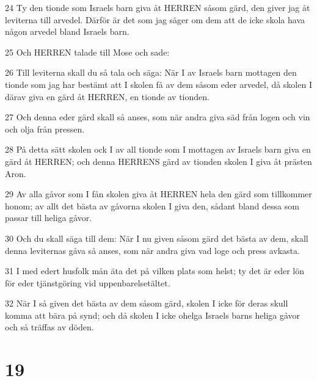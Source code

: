 \par 24 Ty den tionde som Israels barn giva åt HERREN såsom gärd, den giver jag åt leviterna till arvedel. Därför är det som jag säger om dem att de icke skola hava någon arvedel bland Israels barn.
\par 25 Och HERREN talade till Mose och sade:
\par 26 Till leviterna skall du så tala och säga: När I av Israels barn mottagen den tionde som jag har bestämt att I skolen få av dem såsom eder arvedel, då skolen I därav giva en gärd åt HERREN, en tionde av tionden.
\par 27 Och denna eder gärd skall så anses, som när andra giva säd från logen och vin och olja från pressen.
\par 28 På detta sätt skolen ock I av all tionde som I mottagen av Israels barn giva en gärd åt HERREN; och denna HERRENS gärd av tionden skolen I giva åt prästen Aron.
\par 29 Av alla gåvor som I fån skolen giva åt HERREN hela den gärd som tillkommer honom; av allt det bästa av gåvorna skolen I giva den, sådant bland dessa som passar till heliga gåvor.
\par 30 Och du skall säga till dem: När I nu given såsom gärd det bästa av dem, skall denna leviternas gåva så anses, som när andra giva vad loge och press avkasta.
\par 31 I med edert husfolk mån äta det på vilken plats som helst; ty det är eder lön för eder tjänstgöring vid uppenbarelsetältet.
\par 32 När I så given det bästa av dem såsom gärd, skolen I icke för deras skull komma att bära på synd; och då skolen I icke ohelga Israels barns heliga gåvor och så träffas av döden.

\chapter{19}

